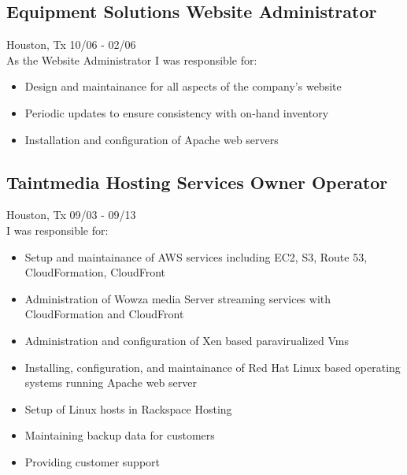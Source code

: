 \documentclass{article}
\begin{document}
  \subsection{Equipment Solutions \hfill Website Administrator}
  Houston, Tx \hfill 10/06 - 02/06\\
  As the Website Administrator I was responsible for:\\
  \begin{itemize}
  \item Design and maintainance for all aspects of the company’s website
  \item Periodic updates to ensure consistency with on-hand inventory
  \item Installation and configuration of Apache web servers
  \end{itemize}
  
  \subsection{Taintmedia Hosting Services \hfill Owner Operator}
  Houston, Tx \hfill 09/03 - 09/13\\
  I was responsible for:\\
  \begin{itemize}
  \item Setup and maintainance of AWS services including EC2, S3, Route 53, CloudFormation, CloudFront
  \item Administration of Wowza media Server streaming services with CloudFormation and CloudFront
  \item Administration and configuration of Xen based paravirualized Vms
  \item Installing, configuration, and maintainance of Red Hat Linux based operating systems running Apache web server
  \item Setup of Linux hosts in Rackspace Hosting
  \item Maintaining backup data for customers
  \item Providing customer support
  \end{itemize}
\end{document}

